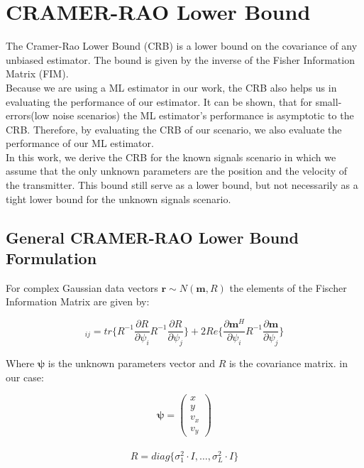 
\chapter{CRAMER-RAO Lower Bound} %
\label{Chapter5}

The Cramer-Rao Lower Bound (CRB) is a lower bound on the covariance of any unbiased estimator. The bound is given by the inverse of the Fisher Information Matrix (FIM).\\

Because we are using a ML estimator in our work, the CRB also helps us in evaluating the performance of our estimator. It can be shown, that for small-errors(low noise scenarios) the ML estimator's performance is asymptotic to the CRB. Therefore, by evaluating the CRB of our scenario, we also evaluate the performance of our ML estimator.\\

In this work, we derive the CRB for the known signals scenario in which we assume that the only unknown parameters are the position and the velocity of the transmitter. This bound still serve as a lower bound, but not necessarily as a tight lower bound for the unknown signals scenario.


\section{General CRAMER-RAO Lower Bound Formulation}
For complex Gaussian data vectors $\mathbf{r} \sim N(\mathbf{m},R)$ the elements of the Fischer Information Matrix are given by:

\begin{equation}
[J]_{ij}=tr\{ R^{-1}\frac{\partial R}{\partial \psi_{i}}R^{-1}\frac{\partial R}{\partial \psi_{j}}\}+2Re\{\frac{\partial \mathbf{m}^H}{\partial \psi_{i}}R^{-1}\frac{\partial \mathbf{m}}{\partial \psi_{j}}\}
\end{equation}

Where $\mathbf{\psi}$ is the unknown parameters vector and $R$ is the covariance matrix. in our case: 

\begin{equation*}
\mathbf{\psi} = \begin{pmatrix} x\\y\\v_x\\v_y\end{pmatrix}
\end{equation*}
\\
\begin{equation*}
R = diag \{\sigma_1^2 \cdot I,\dots,\sigma_L^2 \cdot I\}
\end{equation*}
\\

